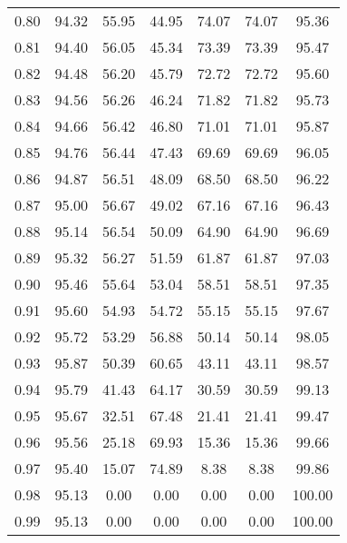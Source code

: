 \begin{tabular}{|c|c|c|c|c|c|c|}
      0.80 &     94.32 &     55.95 &      44.95 &   74.07 &      74.07 &         95.36 \\
      0.81 &     94.40 &     56.05 &      45.34 &   73.39 &      73.39 &         95.47 \\
      0.82 &     94.48 &     56.20 &      45.79 &   72.72 &      72.72 &         95.60 \\
      0.83 &     94.56 &     56.26 &      46.24 &   71.82 &      71.82 &         95.73 \\
      0.84 &     94.66 &     56.42 &      46.80 &   71.01 &      71.01 &         95.87 \\
      0.85 &     94.76 &     56.44 &      47.43 &   69.69 &      69.69 &         96.05 \\
      0.86 &     94.87 &     56.51 &      48.09 &   68.50 &      68.50 &         96.22 \\
      0.87 &     95.00 &     56.67 &      49.02 &   67.16 &      67.16 &         96.43 \\
      0.88 &     95.14 &     56.54 &      50.09 &   64.90 &      64.90 &         96.69 \\
      0.89 &     95.32 &     56.27 &      51.59 &   61.87 &      61.87 &         97.03 \\
      0.90 &     95.46 &     55.64 &      53.04 &   58.51 &      58.51 &         97.35 \\
      0.91 &     95.60 &     54.93 &      54.72 &   55.15 &      55.15 &         97.67 \\
      0.92 &     95.72 &     53.29 &      56.88 &   50.14 &      50.14 &         98.05 \\
      0.93 &     95.87 &     50.39 &      60.65 &   43.11 &      43.11 &         98.57 \\
      0.94 &     95.79 &     41.43 &      64.17 &   30.59 &      30.59 &         99.13 \\
      0.95 &     95.67 &     32.51 &      67.48 &   21.41 &      21.41 &         99.47 \\
      0.96 &     95.56 &     25.18 &      69.93 &   15.36 &      15.36 &         99.66 \\
      0.97 &     95.40 &     15.07 &      74.89 &    8.38 &       8.38 &         99.86 \\
      0.98 &     95.13 &      0.00 &       0.00 &    0.00 &       0.00 &        100.00 \\
      0.99 &     95.13 &      0.00 &       0.00 &    0.00 &       0.00 &        100.00 \\
\bottomrule
\end{tabular}
